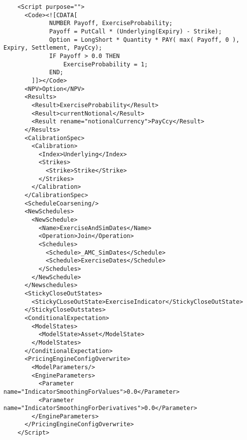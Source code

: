 \begin{verbatim}
    <Script purpose="">
      <Code><![CDATA[
             NUMBER Payoff, ExerciseProbability;
             Payoff = PutCall * (Underlying(Expiry) - Strike);
             Option = LongShort * Quantity * PAY( max( Payoff, 0 ), Expiry, Settlement, PayCcy);
             IF Payoff > 0.0 THEN
                 ExerciseProbability = 1;
             END;
        ]]></Code>
      <NPV>Option</NPV>
      <Results>
        <Result>ExerciseProbability</Result>
        <Result>currentNotional</Result>
        <Result rename="notionalCurrency">PayCcy</Result>
      </Results>
      <CalibrationSpec>
        <Calibration>
          <Index>Underlying</Index>
          <Strikes>
            <Strike>Strike</Strike>
          </Strikes>
        </Calibration>
      </CalibrationSpec>
      <ScheduleCoarsening/>
      <NewSchedules>
        <NewSchedule>
          <Name>ExerciseAndSimDates</Name>
          <Operation>Join</Operation>
          <Schedules>
            <Schedule>_AMC_SimDates</Schedule>
            <Schedule>ExerciseDates</Schedule>
          </Schedules>
        </NewSchedule>
      </Newschedules>
      <StickyCloseOutStates>
        <StickyCLoseOutState>ExerciseIndicator</StickyCloseOutState>
      </StickyCloseOutstates>
      <ConditionalExpectation>
        <ModelStates>
          <ModelState>Asset</ModelState>
        </ModelStates>
      </ConditionalExpectation>
      <PricingEngineConfigOverwrite>
        <ModelParameters/>
        <EngineParameters>
          <Parameter name="IndicatorSmoothingForValues">0.0</Parameter>
          <Parameter name="IndicatorSmoothingForDerivatives">0.0</Parameter>
        </EngineParameters>
      </PricingEngineConfigOverwrite>
    </Script>
\end{verbatim}
